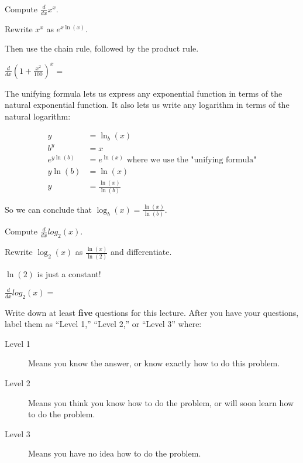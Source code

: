 \documentclass{ximera}
\begin{document}
\begin{question}
  Compute $\frac{d}{dx} x^x$.
  
  \begin{hint}
    Rewrite $x^x$ as $e^{x\ln(x)}$.
  \end{hint}
  \begin{hint}
    Then use the chain rule, followed by the product rule.
  \end{hint}
  $\frac{d}{dx} (1+\frac{x^2}{100})^x = $ 
\end{question}

The unifying formula lets us express any exponential function in terms of the natural exponential function.  It also lets us write any logarithm in terms of the natural logarithm:

\begin{align*}
	y &= \ln_b(x)\\
	b^y &=  x\\
	e^{y\ln(b)} &= e^{\ln(x)} \text{ where we use the "unifying formula"}\\
	y\ln(b) &= \ln(x)\\
	y &= \frac{\ln(x)}{\ln(b)}
\end{align*}

So we can conclude that $\log_b(x) = \frac{\ln(x)}{\ln(b)}$.

\begin{question}
	Compute $\frac{d}{dx} log_2(x)$.
	\begin{hint}
	  Rewrite $\log_2(x)$ as $\frac{\ln(x)}{\ln(2)}$ and differentiate.
	\end{hint}
	\begin{hint}
	  $\ln(2)$ is just a constant!
	\end{hint}
	$\frac{d}{dx} log_2(x)=$
\end{question}


\begin{question}

Write down at least \textbf{five} questions for this lecture. After
you have your questions, label them as ``Level 1,'' ``Level 2,'' or ``Level 3'' where:
\begin{description}
\item[Level 1] Means you know the answer, or know exactly how to do this problem.
\item[Level 2] Means you think you know how to do the problem, or will soon learn how to do the problem.
\item[Level 3] Means you have no idea how to do the problem. 
\end{description}
  \begin{freeResponse}
  \end{freeResponse}
\end{question}
\end{document}
